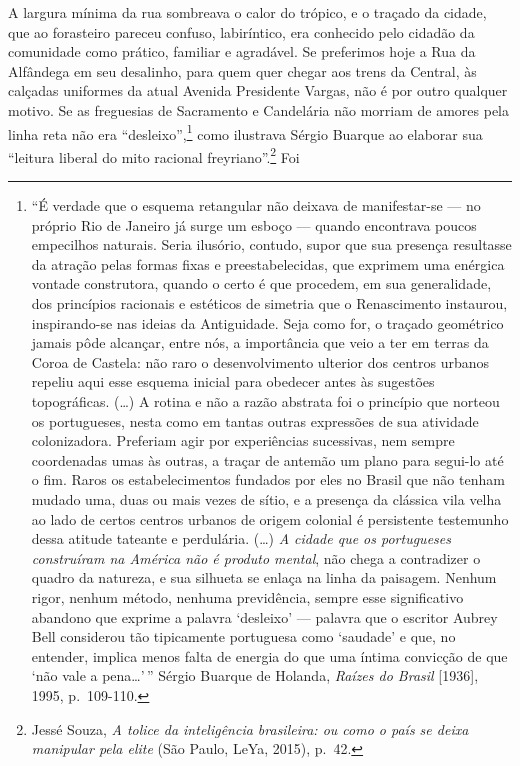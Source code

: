 A largura mínima da rua sombreava o calor do trópico, e o traçado da
cidade, que ao forasteiro pareceu confuso, labiríntico, era conhecido
pelo cidadão da comunidade como prático, familiar e agradável. Se
preferimos hoje a Rua da Alfândega em seu desalinho, para quem quer
chegar aos trens da Central, às calçadas uniformes da atual Avenida
Presidente Vargas, não é por outro qualquer motivo. Se as freguesias de
Sacramento e Candelária não morriam de amores pela linha reta não era
``desleixo'',\footnote{``É verdade que o esquema retangular não deixava
  de manifestar-se --- no próprio Rio de Janeiro já surge um esboço ---
  quando encontrava poucos empecilhos naturais. Seria ilusório, contudo,
  supor que sua presença resultasse da atração pelas formas fixas e
  preestabelecidas, que exprimem uma enérgica vontade construtora,
  quando o certo é que procedem, em sua generalidade, dos princípios
  racionais e estéticos de simetria que o Renascimento instaurou,
  inspirando-se nas ideias da Antiguidade. Seja como for, o traçado
  geométrico jamais pôde alcançar, entre nós, a importância que veio a
  ter em terras da Coroa de Castela: não raro o desenvolvimento ulterior
  dos centros urbanos repeliu aqui esse esquema inicial para obedecer
  antes às sugestões topográficas. (\ldots{}) A rotina e não a razão
  abstrata foi o princípio que norteou os portugueses, nesta como em
  tantas outras expressões de sua atividade colonizadora. Preferiam agir
  por experiências sucessivas, nem sempre coordenadas umas às outras, a
  traçar de antemão um plano para segui-lo até o fim. Raros os
  estabelecimentos fundados por eles no Brasil que não tenham mudado
  uma, duas ou mais vezes de sítio, e a presença da clássica vila velha
  ao lado de certos centros urbanos de origem colonial é persistente
  testemunho dessa atitude tateante e perdulária. (\ldots{}) \textit{A
  cidade que os portugueses construíram na América não é produto
  mental}, não chega a contradizer o quadro da natureza, e sua silhueta
  se enlaça na linha da paisagem. Nenhum rigor, nenhum método, nenhuma
  previdência, sempre esse significativo abandono que exprime a palavra
  `desleixo' --- palavra que o escritor Aubrey Bell considerou tão
  tipicamente portuguesa como `saudade' e que, no entender, implica
  menos falta de energia do que uma íntima convicção de que `não vale a
  pena\dots{}'\,'' Sérgio Buarque de Holanda, \textit{Raízes do Brasil}
  {[}1936{]}, 1995, p.~109-110.} como ilustrava Sérgio Buarque ao
elaborar sua ``leitura liberal do mito racional freyriano''.\footnote{Jessé
  Souza, \textit{A tolice da inteligência brasileira: ou como o país se
  deixa manipular pela elite} (São Paulo, LeYa, 2015), p.~42.} Foi

